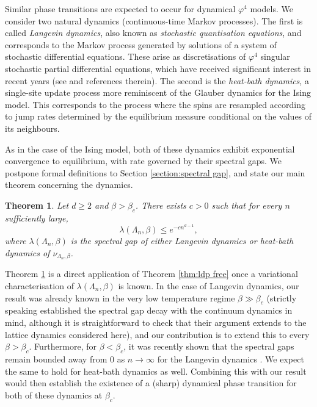 \documentclass[11pt,a4paper]{article}
\newtheorem{theorem}{Theorem}[section]
\theoremstyle{definition}
\numberwithin{equation}{section}
\begin{document}
Similar phase transitions are expected to occur for dynamical $\varphi^4$ models. We consider two natural dynamics (continuous-time Markov processes). The first is called \emph{Langevin dynamics}, also known as \emph{stochastic quantisation equations}, and corresponds to the Markov process generated by solutions of a system of stochastic differential equations. These arise as discretisations of $\varphi^4$ singular stochastic partial differential equations, which have received significant interest in recent years (see \cite{CGW22} and references therein). The second is the \emph{heat-bath dynamics}, a single-site update process more reminiscent of the Glauber dynamics for the Ising model. This corresponds to the process where the spins are resampled according to jump rates determined by the equilibrium measure conditional on the values of its neighbours. 

As in the case of the Ising model, both of these dynamics exhibit exponential convergence to equilibrium, with rate governed by their spectral gaps. We postpone formal definitions  to Section \ref{section:spectral gap}, and state our main theorem concerning the dynamics. 

\begin{theorem} \label{theorem: dynamics}
Let $d \geq 2$ and $\beta > \beta_c$. There exists $c>0$ such that for every $n$ sufficiently large,
\begin{equation}
\lambda(\Lambda_n,\beta)	\leq e^{-cn^{d-1}},
\end{equation}
where $\lambda(\Lambda_n,\beta)$ is the spectral gap of either Langevin dynamics or heat-bath dynamics of $\nu_{\Lambda_n,\beta}$.
\end{theorem}

Theorem \ref{theorem: dynamics} is a direct application of Theorem \ref{thm:ldp free} once a variational characterisation of $\lambda(\Lambda_n,\beta)$ is known. In the case of Langevin dynamics, our result was already known in the very low temperature regime $\beta \gg \beta_c$ \cite{CGW22} (strictly speaking \cite{CGW22} established the spectral gap decay with the continuum dynamics in mind, although it is straightforward to check that their argument extends to the lattice dynamics considered here), and our contribution is to extend this to every $\beta>\beta_c$. Furthermore, for $
\beta<\beta_c$, it was recently shown that the spectral gaps remain bounded away from $0$ as $n \rightarrow \infty$ for the Langevin dynamics \cite{BD24}. We expect the same to hold for heat-bath dynamics as well. Combining this with our result would then establish the existence of a (sharp) dynamical phase transition for both of these dynamics at $\beta_c$.
\end{document}
